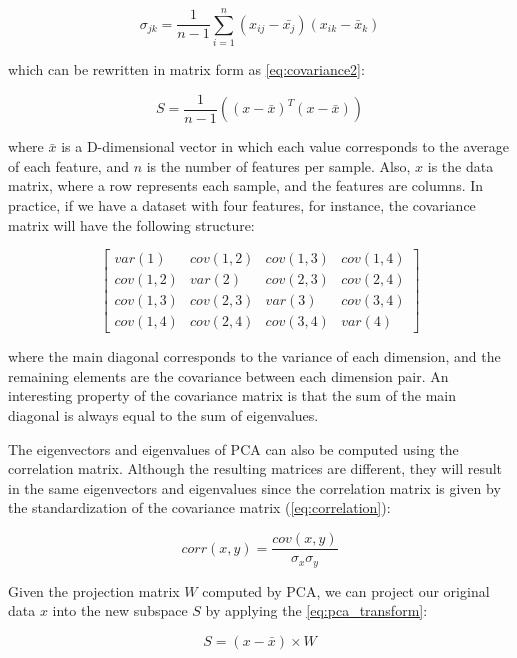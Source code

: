 \begin{equation}
\label{eq:covariance}
\sigma_{jk} = \frac{1}{n-1}\sum_{i=1}^{n}(x_{ij} - \bar{x_j})(x_{ik} - \bar{x}_k)
\end{equation}

\noindent
which can be rewritten in matrix form as \autoref{eq:covariance2}:

\begin{equation}
\label{eq:covariance2}
S = \frac{1}{n-1}((x - \bar{x})^T(x - \bar{x}))
\end{equation}

\noindent
where $\bar{x}$ is a D-dimensional vector in which each value corresponds to the average of each feature, and $n$ is the number of features per sample. Also, $x$ is the data matrix, where a row represents each sample, and the features are columns. In practice, if we have a dataset with four features, for instance, the covariance matrix will have the following structure:

$$
\begin{bmatrix}var(1) & cov(1,2) & cov(1,3) & cov(1,4) 
\\ cov(1,2) & var(2) & cov(2,3) & cov(2,4)
\\ cov(1,3) & cov(2,3) & var(3) & cov(3,4)
\\ cov(1,4) & cov(2,4) & cov(3,4) & var(4)
\end{bmatrix}
$$

\noindent
where the main diagonal corresponds to the variance of each dimension, and the remaining elements are the covariance between each dimension pair. An interesting property of the covariance matrix is that the sum of the main diagonal is always equal to the sum of eigenvalues.

The eigenvectors and eigenvalues of PCA can also be computed using the correlation matrix. Although the resulting matrices are different, they will result in the same eigenvectors and eigenvalues since the correlation matrix is given by the standardization of the covariance matrix (\autoref{eq:correlation}):

\begin{equation}
\label{eq:correlation}
corr(x,y) = \frac{cov(x,y)}{\sigma_x \sigma_y}
\end{equation}

Given the projection matrix $W$ computed by PCA, we can project our original data $x$ into the new subspace $S$ by applying the \autoref{eq:pca_transform}:

\begin{equation}
\label{eq:pca_transform}
S = (x-\bar{x}) \times W
\end{equation}

